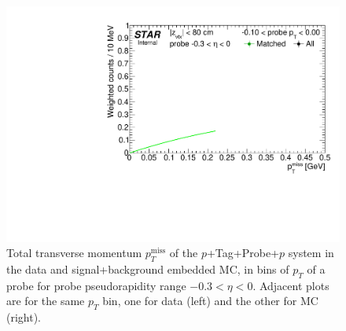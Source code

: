 %
\begin{figure}[h!]
\caption[Tag\&Probe fits to $p_{T}^{\text{miss}}$ in bins of probe $p_{T}$.]{Total transverse momentum $p_{T}^{\text{miss}}$ of the $p$+Tag+Probe+$p$ system in the data and signal+background embedded MC, in bins of $p_{T}$ of a probe for probe pseudorapidity range $-0.3<\eta<0$. Adjacent plots are for the same $p_{T}$ bin, one for data (left) and the other for MC (right).}\label{fig:tagAndProbeTofEffFits_Pt_BinC}
\centering
\parbox{0.24\textwidth}{ 
  \centering
  \includegraphics[width=\linewidth,page=5]{graphics/correctionsToEff/TOF_tagAndProbe/Fitting_effVsPt_data_ETABINS_C.CPT2.pdf}%

}
\end{figure}
